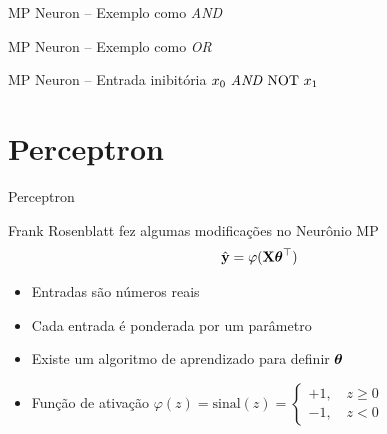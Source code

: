 \documentclass[aspectratio=169,xcolor=dvipsnames]{beamer}
\begin{document}
\begin{frame}{MP Neuron – Exemplo como \textit{AND}}
    \centering
\end{frame}

\begin{frame}{MP Neuron – Exemplo como \textit{OR}}
    \centering
\end{frame}

\begin{frame}{MP Neuron – Entrada inibitória $x_{0}\  \text{\textit{AND}}\ \text{NOT}\ x_{1}$}
    \centering
\end{frame}

\section{Perceptron}

\begin{frame}{Perceptron}

Frank Rosenblatt fez algumas modificações no Neurônio MP
\begin{equation*}
    \hat{\mathbf{y}} = \varphi(\mathbf{X}\bm{\theta}^{\top})
\end{equation*}
\begin{itemize}
    \item Entradas são números reais
    \item Cada entrada é ponderada por um parâmetro
    \item Existe um algoritmo de aprendizado para definir $\bm{\theta}$
    \item Função de ativação $\varphi(z)=\text{sinal}(z)=\begin{cases}
        +1,\quad z\geq0\\
        -1,\quad z<0
    \end{cases}$ 
\end{itemize}
\end{frame}
\end{document}
